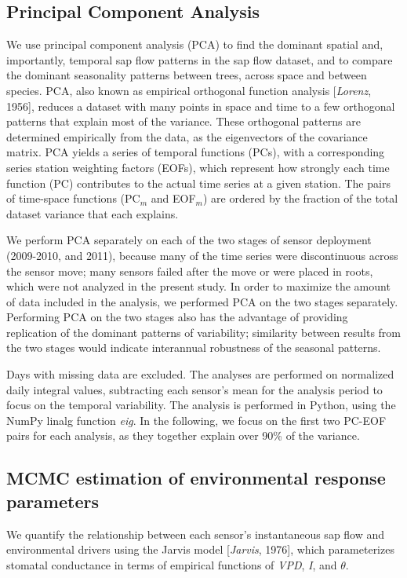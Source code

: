 \subsection{Principal Component Analysis}
We use principal component analysis (PCA) to find the dominant spatial and, importantly, temporal sap flow patterns in the sap flow dataset, and to compare the dominant seasonality patterns between trees, across space and between species.  PCA, also known as empirical orthogonal function analysis [\textit{Lorenz}, 1956], reduces a dataset with many points in space and time to a few orthogonal patterns that explain most of the variance. These orthogonal patterns are determined empirically from the data, as the eigenvectors of the covariance matrix.  PCA yields a series of temporal functions (PCs), with a corresponding series station weighting factors (EOFs), which represent how strongly each time function (PC) contributes to the actual time series at a given station.  The pairs of time-space functions (PC$_m$ and EOF$_m$) are ordered by the fraction of the total dataset variance that each explains.

We perform PCA separately on each of the two stages of sensor deployment (2009-2010, and 2011), because many of the time series were discontinuous across the sensor move; many sensors failed after the move or were placed in roots, which were not analyzed in the present study.  In order to maximize the amount of data included in the analysis, we performed PCA on the two stages separately.  Performing PCA on the two stages also has the advantage of providing replication of the dominant patterns of variability; similarity between results from the two stages would indicate interannual robustness of the seasonal patterns.

Days with missing data are excluded.  The analyses are performed on normalized daily integral values, subtracting each sensor's mean for the analysis period to focus on the temporal variability. The analysis is performed in Python, using the NumPy linalg function \textit{eig}. In the following, we focus on the first two PC-EOF pairs for each analysis, as they together explain over 90\% of the variance.

\subsection{MCMC estimation of environmental response parameters}
We quantify the relationship between each sensor's instantaneous sap flow and environmental drivers using the Jarvis model [\textit{Jarvis}, 1976], which parameterizes stomatal conductance in terms of empirical functions of \textit{VPD}, \textit{I}, and $\theta$.

